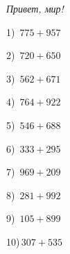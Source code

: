 \documentclass{article}
\begin{document}
 
\begin{center} 
   \large{\textit{Привет, мир!}} 
\end{center}\begin{multicols}{2}
1)$\,\,\,775+957$ \par 
2)$\,\,\,720+650$ \par 
3)$\,\,\,562+671$ \par 
4)$\,\,\,764+922$ \par 
5)$\,\,\,546+688$ \par 
6)$\,\,\,333+295$ \par 
7)$\,\,\,969+209$ \par 
8)$\,\,\,281+992$ \par 
9)$\,\,\,105+899$ \par 
10)$\,307+535$ \par 
\end{multicols} 
\end{document}
